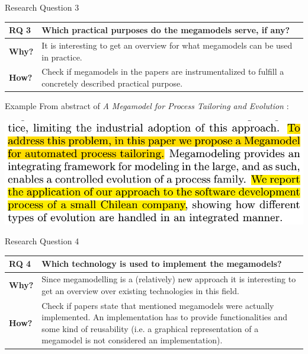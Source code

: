 \documentclass{beamer}
\begin{document}
\begin{frame}{Research Question 3}
\begin{tabular}{|l|p{9cm}|}\hline
\textbf{RQ 3} & Which practical purposes do the megamodels serve, if any?\\\hline
\textbf{Why?} & It is interesting to get an overview for what megamodels can be used in practice.\\\hline
\textbf{How?} & Check if megamodels in the papers are 	instrumentalized to fulfill a concretely described practical purpose.\\\hline
\end{tabular}
\end{frame}

\begin{frame}{Example}
From abstract of \textit{A Megamodel for Process Tailoring and Evolution} \cite{tailoring}:
\begin{center}
\includegraphics[width=1.0\textwidth]{ex_rq3}
\end{center}
\end{frame}

\begin{frame}{Research Question 4}
\begin{tabular}{|l|p{9cm}|}\hline
\textbf{RQ 4} & Which technology is used to implement the megamodels?\\\hline
\textbf{Why?} & Since megamodelling is a (relatively) new approach it is interesting to get an overview over existing technologies in this field.\\\hline
\textbf{How?} & Check if papers state that mentioned megamodels were actually implemented. An implementation has to provide functionalities and some kind of reusability (i.e. a graphical representation of a megamodel is not considered an implementation).\\\hline
\end{tabular}
\end{frame}
\end{document}
